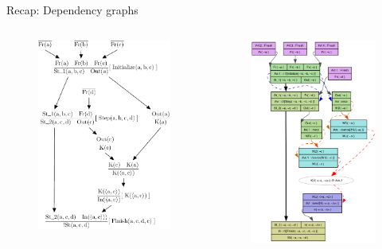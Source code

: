 \documentclass[11pt,aspectratio=169]{beamer}
\begin{document}
\begin{frame}[fragile]{Recap: Dependency graphs}
    \begin{columns}[T]
        \begin{column}{0.5\textwidth}
            \begin{figure}
                \includegraphics[width=.65\textwidth]
                    {./figures/lecture_5/dependency_graph}%
            \end{figure}
        \end{column}
        \begin{column}{0.5\textwidth}
            \begin{figure}
                \includegraphics[width=.6\textwidth]
                    {./figures/lecture_5/dependency_graph_tamarin}%
            \end{figure}
        \end{column}
    \end{columns}
\end{frame}
\end{document}
